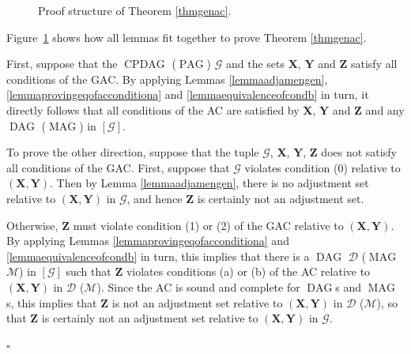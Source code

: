 \documentclass[]{article}
\DeclareMathOperator{\CPDAG}{CPDAG}
\DeclareMathOperator{\DAG}{DAG}
\DeclareMathOperator{\MAG}{MAG}
\DeclareMathOperator{\PAG}{PAG}
\theoremstyle{definition}
\newenvironment{proofthm}{\noindent{\bf Proof of Theorem \ref{thmgenac}:}}%
{\hfill $\square$}
\theoremstyle{remark}
\newcommand{\g}[1][G]{\mathcal{#1}}
\begin{document}
\begin{figure}[!tbp]
    \centering
    \caption{Proof structure of Theorem \ref{thmgenac}.}
    \label{figproof}
\end{figure}

Figure~\ref{figproof} shows how all lemmas fit together to prove Theorem \ref{thmgenac}.

\begin{proofthm}
   First, suppose that the $\CPDAG$ ($\PAG$) $\g$ and the sets $\mathbf{X}$, $\mathbf{Y}$ and $\mathbf{Z}$ satisfy all conditions of the GAC. By applying Lemmas \ref{lemmaadjamengen}, \ref{lemmaprovingeqofacconditiona} and \ref{lemmaequivalenceofcondb} in turn, it directly follows that all conditions of the AC are satisfied by $\mathbf{X}$, $\mathbf{Y}$ and $\mathbf{Z}$ and any $\DAG$ ($\MAG$) in $[\g]$.

   To prove the other direction, suppose that the tuple $\g$, $\mathbf{X}$, $\mathbf{Y}$, $\mathbf{Z}$ does not satisfy all conditions of the GAC. First, suppose that $\g$ violates condition (0) relative to $(\mathbf{X},\mathbf{Y})$. Then by Lemma \ref{lemmaadjamengen}, there is no adjustment set relative to $(\mathbf{X},\mathbf{Y})$ in $\g$, and hence $\mathbf{Z}$ is certainly not an adjustment set.

   Otherwise, $\mathbf{Z}$ must violate condition (1) or (2) of the GAC relative to $(\mathbf{X},\mathbf{Y})$. By applying Lemmas \ref{lemmaprovingeqofacconditiona} and \ref{lemmaequivalenceofcondb} in turn, this implies that there is a $\DAG$ $\g[D]$ ($\MAG$ $\g[M]$) in $[\g]$ such that $\mathbf{Z}$ violates conditions (a) or (b) of the AC relative to $(\mathbf{X},\mathbf{Y})$ in $\g[D]$ ($\g[M]$).
   Since the AC is sound and complete for $\DAG$s and $\MAG$s, this implies that $\mathbf{Z}$ is not an adjustment set relative to $(\mathbf{X},\mathbf{Y})$ in $\g[D]$ ($\g[M]$), so that $\mathbf{Z}$ is certainly not an adjustment set relative to $(\mathbf{X},\mathbf{Y})$ in $\g$.

\end{proofthm}
\end{document}
